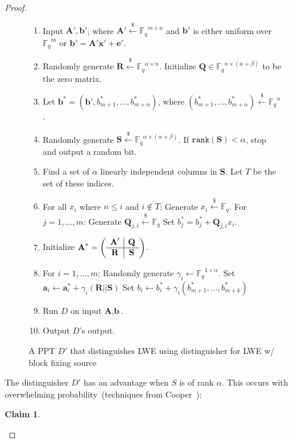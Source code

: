\documentclass[11pt]{article}
\newcommand{\vect}[1]{\ensuremath{\textbf{#1}}}
\newcommand{\Fq}{\ensuremath{\mathbb{F}_q}}
\newcommand{\rank}{\ensuremath{\mathtt{rank}}\xspace}
\newtheorem{claim}[theorem]{Claim}
\newcommand{\ve}{\vect{e}}
\newcommand{\vS}{\vect{S}}
\newcommand{\vA}{\vect{A}}
\newcommand{\vQ}{\vect{Q}}
\newcommand{\vR}{\vect{R}}
\newcommand{\vx}{\vect{x}}
\newcommand{\va}{\vect{a}}
\newcommand{\vb}{\vect{b}}
\begin{document}
\begin{proof}
\begin{figure}[p]
\begin{framed}
\begin{enumerate}
\item Input $\vA', \vb'$, where $\vA' \overset{\$} \leftarrow \Fq^{m\times n}$ and $\vb'$ is either uniform over $\Fq^m$ or $\vb' = \vA'\vx' +\ve'$.
\item Randomly generate $\vect{R} \overset{\$}\leftarrow \Fq^{\alpha \times n}$. Initialize $\vQ \in \Fq^{n\times (\alpha+\beta)}$ to be the zero matrix.
\item Let $\vb^* = (\vb', b^*_{m+1}, \ldots,b^*_{m+\alpha})$, where $(b^*_{m+1}, \ldots, b^*_{m+\alpha} )\overset{\$} \leftarrow \Fq^\alpha$.\label{step:b generation}
\item Randomly generate $\vect{S} \overset{\$}\leftarrow \Fq^{\alpha \times (\alpha+\beta)}$.
		\subitem If $\rank(\vect{S})<\alpha$, stop and output a random bit.
\item Find a set of $\alpha$ linearly independent columns in $\vS$.  Let $T$ be the set of these indices.
\item For all $x_i$ where $n\leq i$ and $i\not \in T$:\label{step:fill in matrix}
\subitem Generate $x_i\overset{\$}\leftarrow \Fq$.  
\subitem For $j=1,..., m$:
\subsubitem Generate $\vQ_{j, i}\overset{\$}\leftarrow \Fq$
\subsubitem Set $b_j^* = b_j^* + \vQ_{j, i} x_i$.
\item Initialize $\vA^*  = \left(\begin{array}{c | c}\vA' & \vQ\\\hline \vR & \vS\end{array}\right)$.
\item \label{step:randomization}
For {$i=1,..., m$}:
\subitem Randomly generate $\gamma_i \leftarrow \Fq^{1 \times \alpha}$.
\subitem Set $\va_{i} \leftarrow \va^*_{i}+\gamma_i (\vR||\vS)$
\subitem Set $b_i \leftarrow b^*_i + \gamma_i (b^*_{m+1},..., b^*_{m+k})$
\item Run $D$ on input $\vA, \vb$.
\item Output $D$'s output.
\end{enumerate}
\end{framed}
\caption{A PPT $D'$ that distinguishes LWE using distinguisher for LWE w/ block fixing source}
\label{fig:perfectLWEreduction}
\end{figure}
The distinguisher $D'$ has an advantage when $S$ is of rank $\alpha$.  This occurs with overwhelming probability~(techniques from Cooper~\cite{cooper2000rank}):
\begin{claim}

\end{claim}
\end{proof}
\end{document}
